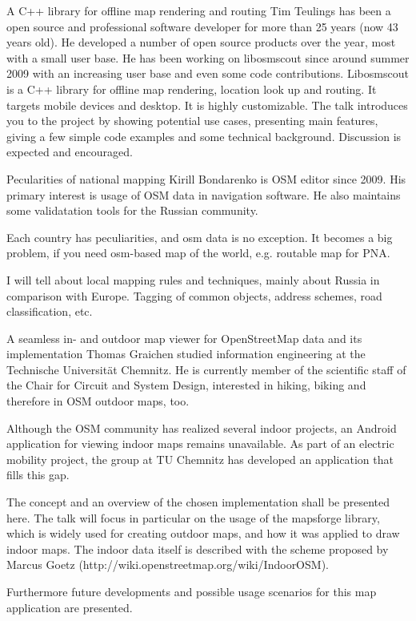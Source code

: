 %
{A C++ library for offline map rendering and routing}%
{Tim Teulings has been a open source and professional software developer for more than 25 years (now 43 years old). He developed a number of open source products over the year, most with a small user base. He has been working on libosmscout since around summer 2009 with an increasing user base and even some code contributions.}%
{Libosmscout is a C++ library for offline map rendering, location look up and routing. It targets mobile devices and desktop. It is highly customizable.
The talk introduces you to the project by showing potential use cases, presenting main features, giving a few simple code examples and some technical background. Discussion is expected and encouraged.}


%
{Pecularities of national mapping}%
{Kirill Bondarenko is OSM editor since 2009. His primary interest is usage of OSM data in navigation software. He also maintains some validatation tools for the Russian community.}%
{Each country has peculiarities, and osm data is no exception. It becomes a big problem, if you need osm-based map of the world, e.g. routable map for PNA.

I will tell about local mapping rules and techniques, mainly about Russia in comparison with Europe. Tagging of common objects, address schemes, road classification, etc.}


%
{A seamless in- and outdoor map viewer for OpenStreetMap data and its implementation}%
{Thomas Graichen studied information engineering at the Technische Universität Chemnitz. He is currently member of the scientific staff of the Chair for Circuit and System Design, interested in hiking, biking and therefore in OSM outdoor maps, too.}%
{Although the OSM community has realized several indoor projects, an Android application for viewing indoor maps remains unavailable. As part of an electric mobility project, the group at TU Chemnitz has developed an application that fills this gap.

The concept and an overview of the chosen implementation shall be presented here. The talk will focus in particular on the usage of the mapsforge library, which is widely used for creating outdoor maps, and how it was applied to draw indoor maps. The indoor data itself is described with the scheme proposed by Marcus Goetz (http://wiki.openstreetmap.org/wiki/IndoorOSM).

Furthermore future developments and possible usage scenarios for this map application are presented.}


